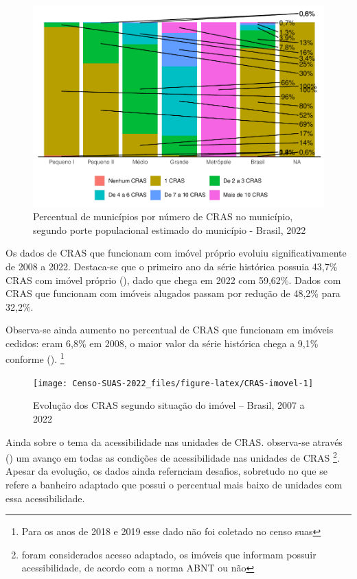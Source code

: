 \documentclass[
  brazilian]{report}
\begin{document}
\begin{figure}
\includegraphics{Censo-SUAS-2022_files/figure-latex/CRAS-porte-1} \caption[Percentual de municípios por número de CRAS no município, segundo porte populacional estimado do município - Brasil, 2022]{Percentual de municípios por número de CRAS no município, segundo porte populacional estimado do município - Brasil, 2022}\label{fig:CRAS-porte}
\end{figure}

Os dados de CRAS que funcionam com imóvel próprio evoluiu
significativamente de 2008 a 2022. Destaca-se que o primeiro ano da
série histórica possuia 43,7\% CRAS com imóvel próprio
(), dado que chega em 2022 com 59,62\%. Dados com
CRAS que funcionam com imóveis alugados passam por redução de 48,2\%
para 32,2\%.

Observa-se ainda aumento no percentual de CRAS que funcionam em imóveis
cedidos: eram 6,8\% em 2008, o maior valor da série histórica chega a
9,1\% conforme ().
\footnote{Para os anos de 2018 e 2019 esse dado não foi coletado no censo suas}

\begin{figure}
\texttt{[image: Censo-SUAS-2022\_files/figure-latex/CRAS-imovel-1]} \caption[Evolução dos CRAS segundo situação do imóvel – Brasil, 2007 a 2022]{Evolução dos CRAS segundo situação do imóvel – Brasil, 2007 a 2022}\label{fig:CRAS-imovel}
\end{figure}

Ainda sobre o tema da acessibilidade nas unidades de CRAS. observa-se
através () um avanço em todas as condições
de acessibilidade nas unidades de CRAS
\footnote{foram considerados acesso adaptado, os imóveis que informam possuir acessibilidade, de acordo com a norma ABNT ou não}.
Apesar da evolução, os dados ainda refernciam desafios, sobretudo no que
se refere a banheiro adaptado que possui o percentual mais baixo de
unidades com essa acessibilidade.
\end{document}
